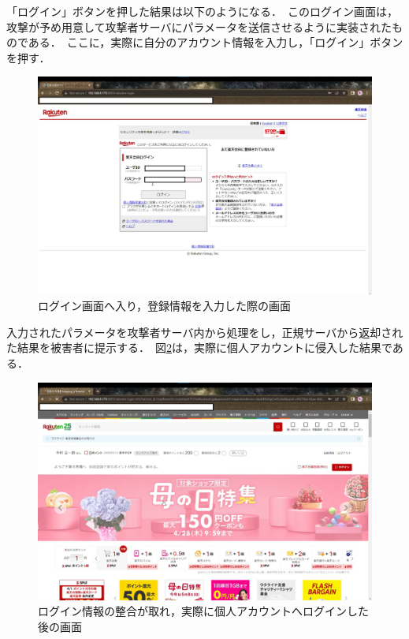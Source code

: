 \documentclass[dvipdfmx]{jsarticle}
\begin{document}
                    「ログイン」ボタンを押した結果は以下のようになる．\
                    このログイン画面は，攻撃が予め用意して攻撃者サーバにパラメータを送信させるように実装されたものである．\
                    ここに，実際に自分のアカウント情報を入力し，「ログイン」ボタンを押す．\
                    \begin{figure}[pth]
                        \centering
                        \includegraphics[width=15cm]{img/rakuten/rakuten-04.png}
                        \caption{ログイン画面へ入り，登録情報を入力した際の画面}
                        \label{rakuten-04}
                    \end{figure}
                    入力されたパラメータを攻撃者サーバ内から処理をし，正規サーバから返却された結果を被害者に提示する．\
                    図\ref{rakuten-05}は，実際に個人アカウントに侵入した結果である．\
                    \begin{figure}[ht]
                        \centering
                        \includegraphics[width=15cm]{img/rakuten/rakuten-05.png}
                        \caption{ログイン情報の整合が取れ，実際に個人アカウントへログインした後の画面}
                        \label{rakuten-05}
                    \end{figure}
                    \clearpage
\end{document}
